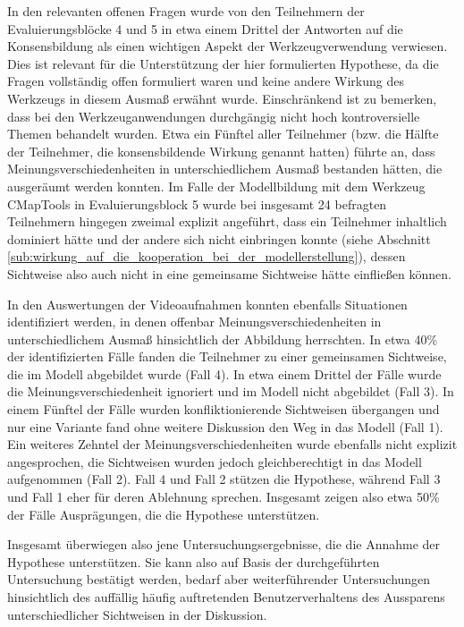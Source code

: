 In den relevanten offenen Fragen wurde von den Teilnehmern der Evaluierungsblöcke 4 und 5 in etwa einem Drittel der Antworten auf die Konsensbildung als einen wichtigen Aspekt der Werkzeugverwendung verwiesen. Dies ist relevant für die Unterstützung der hier formulierten Hypothese, da die Fragen vollständig offen formuliert waren und keine andere Wirkung des Werkzeugs in diesem Ausmaß erwähnt wurde. Einschränkend ist zu bemerken, dass bei den Werkzeuganwendungen durchgängig nicht hoch kontroversielle Themen behandelt wurden. Etwa ein Fünftel aller Teilnehmer (bzw. die Hälfte der Teilnehmer, die konsensbildende Wirkung genannt hatten) führte an, dass Meinungsverschiedenheiten in unterschiedlichem Ausmaß bestanden hätten, die ausgeräumt werden konnten. Im Falle der Modellbildung mit dem Werkzeug CMapTools in Evaluierungsblock 5 wurde bei insgesamt 24 befragten Teilnehmern hingegen zweimal explizit angeführt, dass ein Teilnehmer inhaltlich dominiert hätte und der andere sich nicht einbringen konnte (siehe Abschnitt \ref{sub:wirkung_auf_die_kooperation_bei_der_modellerstellung}), dessen Sichtweise also auch nicht in eine gemeinsame Sichtweise hätte einfließen können.

In den Auswertungen der Videoaufnahmen konnten ebenfalls Situationen identifiziert werden, in denen offenbar Meinungsverschiedenheiten in unterschiedlichem Ausmaß hinsichtlich der Abbildung herrschten. In etwa 40\% der identifizierten Fälle fanden die Teilnehmer zu einer gemeinsamen Sichtweise, die im Modell abgebildet wurde (Fall 4). In etwa einem Drittel der Fälle wurde die Meinungsverschiedenheit ignoriert und im Modell nicht abgebildet (Fall 3). In einem Fünftel der Fälle wurden konfliktionierende Sichtweisen übergangen und nur eine Variante fand ohne weitere Diskussion den Weg in das Modell (Fall 1). Ein weiteres Zehntel der Meinungsverschiedenheiten wurde ebenfalls nicht explizit angesprochen, die Sichtweisen wurden jedoch gleichberechtigt in das Modell aufgenommen (Fall 2). Fall 4 und Fall 2 stützen die Hypothese, während Fall 3 und Fall 1 eher für deren Ablehnung sprechen. Insgesamt zeigen also etwa 50\% der Fälle Ausprägungen, die die Hypothese unterstützen.   

Insgesamt überwiegen also jene Untersuchungsergebnisse, die die Annahme der Hypothese unterstützen. Sie kann also auf Basis der durchgeführten Untersuchung bestätigt werden, bedarf aber weiterführender Untersuchungen hinsichtlich des auffällig häufig auftretenden Benutzerverhaltens des Aussparens unterschiedlicher Sichtweisen in der Diskussion.

